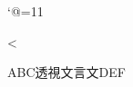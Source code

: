 \catcode`@=11

\loop
    \catcode{} \advance\count@\@ne
\ifnum\count@<\@cclvi\repeat

ABC透視文言文DEF

\bye
